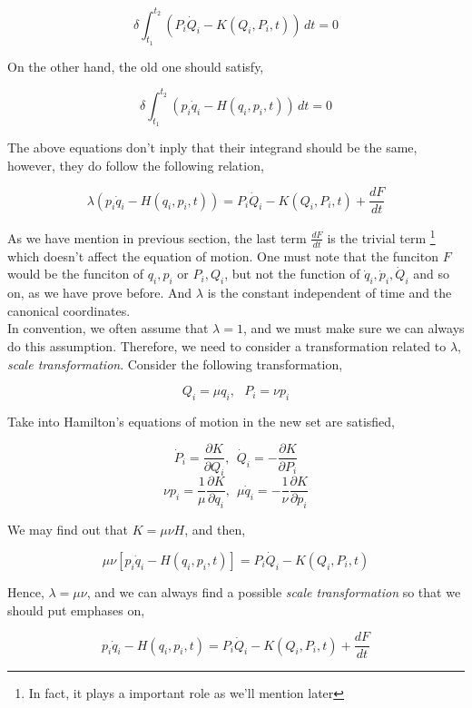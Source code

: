 \documentclass[12pt]{article}
\begin{document}
\begin{center}
    \[ \delta \int_{t_1}^{t_2} \left( P_i\dot{Q}_i - K(Q_i, P_i, t) \right) \, dt = 0 \]
\end{center}

On the other hand, the old one should satisfy, 

\begin{center}
    \[ \delta \int_{t_1}^{t_2} \left( p_i\dot{q}_i - H(q_i, p_i, t) \right) \, dt = 0 \]
\end{center}

The above equations don't inply that their integrand should be the same, however, they do follow the following relation,

\begin{center}
    \[ \lambda \left(p_i\dot{q}_i - H(q_i, p_i, t) \right) = P_i\dot{Q}_i - K(Q_i, P_i, t) + \frac{dF}{dt} \]
\end{center}

As we have mention in previous section, the last term $\frac{dF}{dt}$ is the trivial term \footnote{In fact, it plays a important role as we'll mention later} which doesn't affect the equation of motion. One must note that the funciton $F$ would be the funciton of $q_i, p_i$ or $P_i, Q_i$, but not the function of $\dot{q}_i, \dot{p}_i, \dot{Q}_i$ and so on, as we have prove before. And $\lambda$ is the constant independent of time and the canonical coordinates.
\\
\indent In convention, we often assume that $\lambda = 1$, and we must make sure we can always do this assumption. Therefore, we need to consider a transformation related to $\lambda$, \textit{scale transformation}. Consider the following transformation, 

\begin{center}
    \[ Q_i = \mu q_i,\ \ \ P_i = \nu p_i \]
\end{center}

Take into Hamilton's equations of motion in the new set are satisfied,

\begin{center}
    \[ \dot{P}_i = \frac{\partial K}{\partial Q_i},\ \ \dot{Q}_i = - \frac{\partial K}{\partial P_i} \]
    \[ \nu p_i = \frac{1}{\mu} \frac{\partial K}{\partial q_i},\ \ \mu \dot{q}_i = -\frac{1}{\nu} \frac{\partial K}{\partial p_i} \]
\end{center}

We may find out that $K = \mu \nu H$, and then,

\begin{center}
    \[ \mu \nu \left[ p_i\dot{q}_i - H(q_i, p_i, t) \right] = P_i\dot{Q}_i - K(Q_i, P_i, t) \]
\end{center}

Hence, $\lambda = \mu \nu$, and we can always find a possible \textit{scale transformation} so that we should put emphases on,

\begin{center}
    \[ p_i\dot{q}_i - H(q_i, p_i, t) = P_i\dot{Q}_i - K(Q_i, P_i, t) + \frac{dF}{dt} \]
\end{center}
\end{document}
